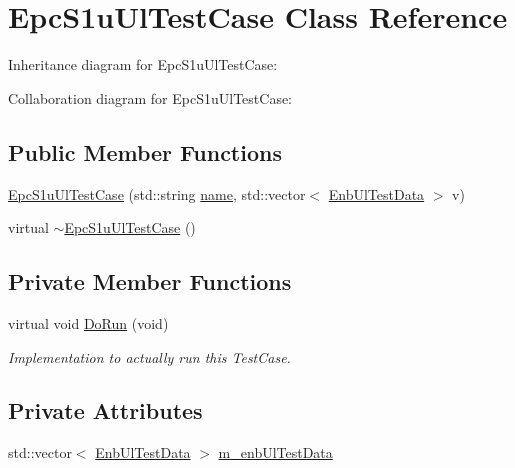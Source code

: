 \hypertarget{classEpcS1uUlTestCase}{}\section{Epc\+S1u\+Ul\+Test\+Case Class Reference}
\label{classEpcS1uUlTestCase}


Inheritance diagram for Epc\+S1u\+Ul\+Test\+Case\+:


Collaboration diagram for Epc\+S1u\+Ul\+Test\+Case\+:
\subsection*{Public Member Functions}
\begin{DoxyCompactItemize}
\item 
\hyperlink{classEpcS1uUlTestCase_a22c603e82af70be3d4e9805cd5f8140d}{Epc\+S1u\+Ul\+Test\+Case} (std\+::string \hyperlink{generate__test__data__lte__spectrum__model_8m_ab74e6bf80237ddc4109968cedc58c151}{name}, std\+::vector$<$ \hyperlink{structEnbUlTestData}{Enb\+Ul\+Test\+Data} $>$ v)
\item 
virtual \hyperlink{classEpcS1uUlTestCase_af41a8c80af51b50b6cba45eadc170dab}{$\sim$\+Epc\+S1u\+Ul\+Test\+Case} ()
\end{DoxyCompactItemize}
\subsection*{Private Member Functions}
\begin{DoxyCompactItemize}
\item 
virtual void \hyperlink{classEpcS1uUlTestCase_a6fa27997312de46d9b0f3ab2221a24fa}{Do\+Run} (void)
\begin{DoxyCompactList}\small\item\em Implementation to actually run this Test\+Case. \end{DoxyCompactList}\end{DoxyCompactItemize}
\subsection*{Private Attributes}
\begin{DoxyCompactItemize}
\item 
std\+::vector$<$ \hyperlink{structEnbUlTestData}{Enb\+Ul\+Test\+Data} $>$ \hyperlink{classEpcS1uUlTestCase_a2d52c6d9f4ee886f2060016760d7bf4d}{m\+\_\+enb\+Ul\+Test\+Data}
\end{DoxyCompactItemize}
